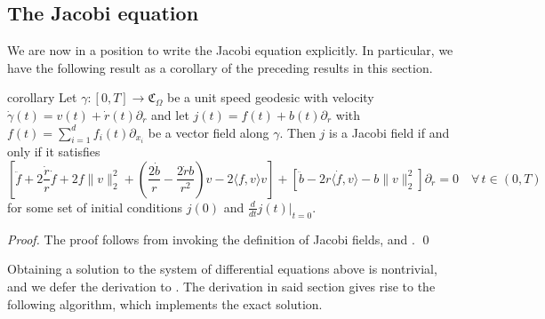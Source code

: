 \documentclass{article}
\begin{document}
\subsection{The Jacobi equation}

We are now in a position to write the Jacobi equation explicitly. In particular, we have the following result as a corollary of the preceding results in this section.

\begin{restatable}{corollary}{}
    Let $\gamma:[0, T] \rightarrow \mathfrak{C}_\Omega$ be a unit speed geodesic with velocity $\dot \gamma(t) = v(t) + \dot r(t)\partial_r$ and let $j(t) = f(t) + b(t)\partial_r$ with $f(t) = \sum_{i = 1}^df_i(t)\partial_{x_i}$ be a vector field along $\gamma$. Then $j$ is a Jacobi field if and only if it satisfies 
    \[\left[\ddot f + 2\frac{\dot r}{r}\dot f + 2f\|v\|_2^2  + \left(\frac{2\dot b}{r} - \frac{2 \dot rb}{r^2}\right)v - 2\langle f,v\rangle v\right] + \left[\ddot b - 2r\langle \dot f, v\rangle - b\|v\|_2^2\right]\partial_r = 0 \quad \forall \,t \in (0, T)\]
    for some set of initial conditions $j(0)$ and $\frac{d}{dt}j(t)|_{t = 0}$.
\end{restatable}
\noindent \textit{Proof.} The proof follows from invoking the definition of Jacobi fields,  and . \qed{}

Obtaining a solution to the system of differential equations above is nontrivial, and we defer the derivation to . The derivation in said section gives rise to the following algorithm, which implements the exact solution. 
\end{document}
